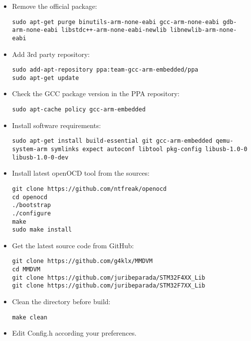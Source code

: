 \documentclass[]{article}
\begin{document}
\begin{itemize}[leftmargin=*]
	
\item Remove the official package:
\begin{lstlisting}[style=DOS]
sudo apt-get purge binutils-arm-none-eabi gcc-arm-none-eabi gdb-arm-none-eabi libstdc++-arm-none-eabi-newlib libnewlib-arm-none-eabi
\end{lstlisting}

\item Add 3rd party repository:
\begin{lstlisting}[style=DOS]
sudo add-apt-repository ppa:team-gcc-arm-embedded/ppa
sudo apt-get update
\end{lstlisting}

\item Check the GCC package version in the PPA repository:
\begin{lstlisting}[style=DOS]
sudo apt-cache policy gcc-arm-embedded
\end{lstlisting}

\item Install software requirements:
\begin{lstlisting}[style=DOS]
sudo apt-get install build-essential git gcc-arm-embedded qemu-system-arm symlinks expect autoconf libtool pkg-config libusb-1.0-0 libusb-1.0-0-dev
\end{lstlisting}

\item Install latest openOCD tool from the sources:
\begin{lstlisting}[style=DOS]
git clone https://github.com/ntfreak/openocd
cd openocd
./bootstrap
./configure
make
sudo make install
\end{lstlisting}
	
\item Get the latest source code from GitHub:
\begin{lstlisting}[style=DOS]
git clone https://github.com/g4klx/MMDVM
cd MMDVM
git clone https://github.com/juribeparada/STM32F4XX_Lib
git clone https://github.com/juribeparada/STM32F7XX_Lib
\end{lstlisting}
	
\item Clean the directory before build:
\begin{lstlisting}[style=DOS]
make clean
\end{lstlisting}
	
\item Edit Config.h according your preferences.
	

\end{itemize}
\end{document}
